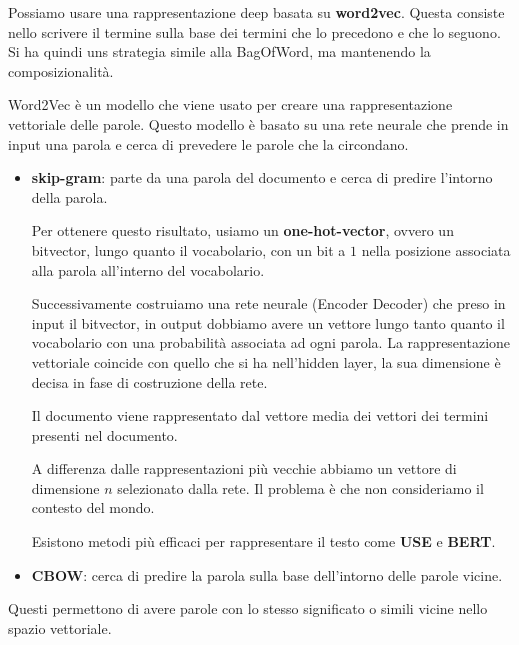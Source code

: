 Possiamo usare una rappresentazione deep basata su \textbf{word2vec}. Questa consiste
nello scrivere il termine sulla base dei termini che lo precedono e che lo seguono.
Si ha quindi uns strategia simile alla BagOfWord, ma mantenendo la composizionalità.

Word2Vec è un modello che viene usato per creare una rappresentazione vettoriale
delle parole. Questo modello è basato su una rete neurale che prende in input
una parola e cerca di prevedere le parole che la circondano.
\begin{itemize}
      \item \textbf{skip-gram}: parte da una parola del documento e cerca di
            predire l'intorno della parola.

            Per ottenere questo risultato, usiamo un \textbf{one-hot-vector},
            ovvero un bitvector, lungo quanto il vocabolario, con un bit a $1$
            nella posizione associata alla parola all'interno del vocabolario.

            Successivamente costruiamo una rete neurale (Encoder Decoder) che
            preso in input il bitvector, in output dobbiamo avere un vettore
            lungo tanto quanto il vocabolario con una probabilità associata ad
            ogni parola. La rappresentazione vettoriale coincide con  quello che
            si ha nell'hidden layer, la sua dimensione è decisa in fase di
            costruzione della rete.

            Il documento viene rappresentato dal vettore media dei vettori dei
            termini presenti nel documento.

            A differenza dalle rappresentazioni più vecchie abbiamo un vettore di
            dimensione $n$ selezionato dalla rete. Il problema è che non consideriamo
            il contesto del mondo.

            Esistono metodi più efficaci per rappresentare il testo come
            \textbf{USE} e \textbf{BERT}.
      \item \textbf{CBOW}: cerca di predire la parola sulla base dell'intorno
            delle parole vicine.
\end{itemize}
Questi permettono di avere parole con lo stesso significato o simili vicine nello
spazio vettoriale.

